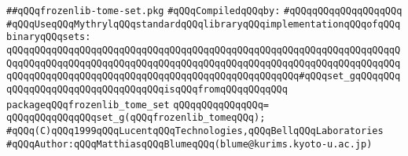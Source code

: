 \label{src/app/makelib/freezefile/frozenlib-tome-set.pkg}
\verb|##qQQqfrozenlib-tome-set.pkg|\newline
\newline
\verb|#qQQqCompiledqQQqby:|\newline
\verb|#qQQqqQQqqQQqqQQqqQQq|\newline
\newline
\verb|#qQQqUseqQQqMythrylqQQqstandardqQQqlibraryqQQqimplementationqQQqofqQQqbinaryqQQqsets:|\newline
\newline
\verb|qQQqqQQqqQQqqQQqqQQqqQQqqQQqqQQqqQQqqQQqqQQqqQQqqQQqqQQqqQQqqQQqqQQqqQQqqQQqqQQqqQQqqQQqqQQqqQQqqQQqqQQqqQQqqQQqqQQqqQQqqQQqqQQqqQQqqQQqqQQqqQQqqQQqqQQqqQQqqQQqqQQqqQQqqQQqqQQqqQQqqQQqqQQqqQQq#qQQqset_gqQQqqQQqqQQqqQQqqQQqqQQqqQQqqQQqqQQqisqQQqfromqQQqqQQqqQQq|\newline
\verb|packageqQQqfrozenlib_tome_set|\newline
\verb|qQQqqQQqqQQqqQQq=|\newline
\verb|qQQqqQQqqQQqqQQqset_g(qQQqfrozenlib_tomeqQQq);|\newline
\newline
\newline
\verb|#qQQq(C)qQQq1999qQQqLucentqQQqTechnologies,qQQqBellqQQqLaboratories|\newline
\verb|#qQQqAuthor:qQQqMatthiasqQQqBlumeqQQq(blume@kurims.kyoto-u.ac.jp)|\newline
\newline

